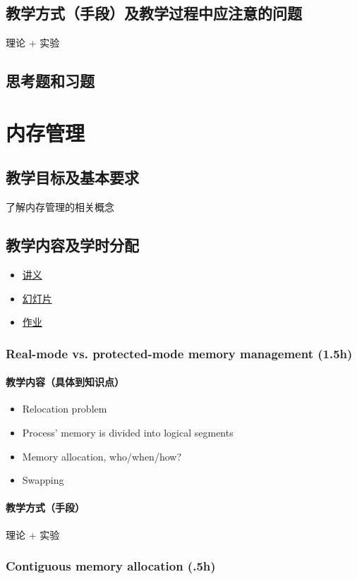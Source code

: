 \documentclass[11pt]{article}
\begin{document}
\subsection{教学方式（手段）及教学过程中应注意的问题}
\label{sec-5-5}
理论 + 实验
\subsection{思考题和习题}
\label{sec-5-6}
\section{内存管理}
\label{sec-6}
\subsection{教学目标及基本要求}
\label{sec-6-1}
了解内存管理的相关概念
\subsection{教学内容及学时分配}
\label{sec-6-2}
\begin{itemize}
\item \href{./slides/mm-a.pdf}{讲义}
\item \href{./slides/mm-b.pdf}{幻灯片}
\item \href{./lab.html#sec-5}{作业}
\end{itemize}
\subsubsection{Real-mode vs. protected-mode memory management (1.5h)}
\label{sec-6-2-1}
\paragraph{教学内容（具体到知识点）}
\label{sec-6-2-1-1}
\begin{itemize}
\item Relocation problem
\item Process' memory is divided into logical segments
\item Memory allocation, who/when/how?
\item Swapping
\end{itemize}
\paragraph{教学方式（手段）}
\label{sec-6-2-1-2}
理论 + 实验
\subsubsection{Contiguous memory allocation (.5h)}
\label{sec-6-2-2}
\end{document}
